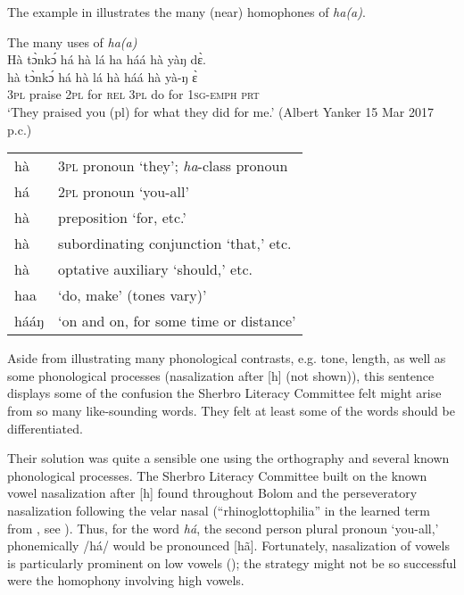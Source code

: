 The example in  illustrates the many (near) homophones of \textit{ha(a)}.

\ea%
\label{ex:10}
The many uses of \textit{ha(a)}\\
\ea 
\label{ex:10a}
Hà tɔ̀nkɔ́ há hà lá ha háá hà yàŋ dɛ̀.\\
\gll hà    tɔ̀nkɔ́    há    hà    lá    hà    háá  hà    yà-ŋ      ɛ̀\\
\textsc{3pl}  praise    \textsc{2pl}  for    \textsc{rel}  \textsc{3pl}  do    for    \textsc{1sg-emph}  \textsc{prt}\\
\glt ‘They praised you (pl) for what they did for me.' (Albert Yanker 15 Mar 2017 p.c.)\\

\vspace{6pt}

\ex
\label{ex:10b}

\begin{tabular}[t]{ll}
hà & 3\textsc{pl} pronoun ‘they'; \textit{ha}{}-class pronoun\\
há & 2\textsc{pl} pronoun ‘you-all'\\
hà & preposition ‘for, etc.'\\
hà & subordinating conjunction ‘that,' etc.\\
hà & optative auxiliary ‘should,' etc.\\
haa & ‘do, make' (tones vary)'\\
hááŋ & ‘on and on, for some time or distance'\\
\end{tabular}
\z
\z

Aside from illustrating many phonological contrasts, e.g. tone, length, as well as some phonological processes (nasalization after [h] (not shown)), this sentence displays some of the confusion the Sherbro Literacy Committee felt might arise from so many like-sounding words. They felt at least some of the words should be differentiated.

Their solution was quite a sensible one using the orthography and several known phonological processes. The Sherbro Literacy Committee built on the known vowel nasalization after [h] found throughout Bolom and the perseveratory nasalization following the velar nasal (“rhinoglottophilia” in the learned term from \citet{Matisoff1975}, see ). Thus, for the word \textit{há}, the second person plural pronoun ‘you-all,' phonemically /há/ would be pronounced [hã]. Fortunately, nasalization of vowels is particularly prominent on low vowels (\citealt{Ohala1975}); the strategy might not be so successful were the homophony involving high vowels.

